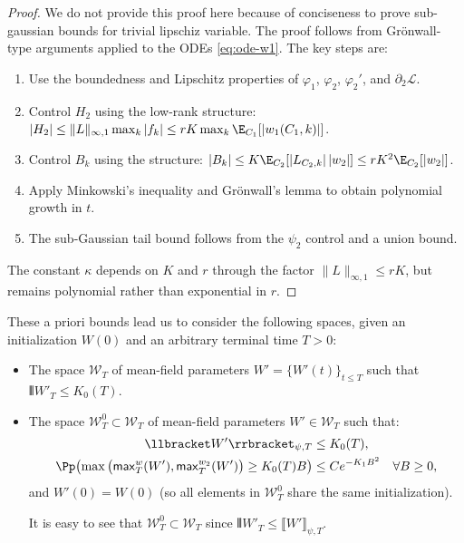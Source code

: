\documentclass[nohyperref]{article}
\theoremstyle{plain}
\theoremstyle{definition}
\theoremstyle{remark}
\begin{document}
\begin{proof}
We do not provide this proof here because of conciseness to prove sub-gaussian bounds for trivial lipschiz variable. The proof follows from Grönwall-type arguments applied to the ODEs \eqref{eq:ode-w1}. The key steps are:
\begin{enumerate}
\item Use the boundedness and Lipschitz properties of $\varphi_1$, $\varphi_2$, $\varphi_2'$, and $\partial_2\mathcal{L}$.
\item Control $H_2$ using the low-rank structure: $|H_2|\le \|L\|_{\infty,1}\max_k|f_k|\le rK\max_k\E_{C_1}[|w_1(C_1,k)|]$.
\item Control $B_k$ using the structure: $|B_k|\le K\E_{C_2}[|L_{C_2,k}|\,|w_2|]\le rK^2\E_{C_2}[|w_2|]$.
\item Apply Minkowski's inequality and Grönwall's lemma to obtain polynomial growth in $t$.
\item The sub-Gaussian tail bound follows from the $\psi_2$ control and a union bound.
\end{enumerate}
The constant $\kappa$ depends on $K$ and $r$ through the factor $\|L\|_{\infty,1}\le rK$, but remains polynomial rather than exponential in $r$.
\end{proof}

These a priori bounds lead us to consider the following spaces, given an initialization $W(0)$ and an arbitrary terminal time $T>0$:

\begin{itemize}
\item The space $\mathcal{W}_T$ of mean-field parameters $W'=\{W'(t)\}_{t\le T}$ such that ${\interleave{W'}}_T \le K_0(T)$.

\item The space $\mathcal{W}_T^0\subset\mathcal{W}_T$ of mean-field parameters $W'\in\mathcal{W}_T$ such that:
\begin{align*}
\llbracket W'\rrbracket_{\psi,T} &\le K_0(T),\\
\Pp\!\left(\max\big(\mathsf{max}_T^w(W'), \mathsf{max}_T^{w_2}(W')\big)\ge K_0(T)B\right) &\le C e^{-K_1 B^2} \quad \forall B\ge 0,
\end{align*}
and $W'(0)=W(0)$ (so all elements in $\mathcal{W}_T^0$ share the same initialization).

It is easy to see that $\mathcal{W}_T^0\subset\mathcal{W}_T$ since ${\interleave{W'}}_T \le \llbracket W'\rrbracket_{\psi,T}$.
\end{itemize}
\end{document}
